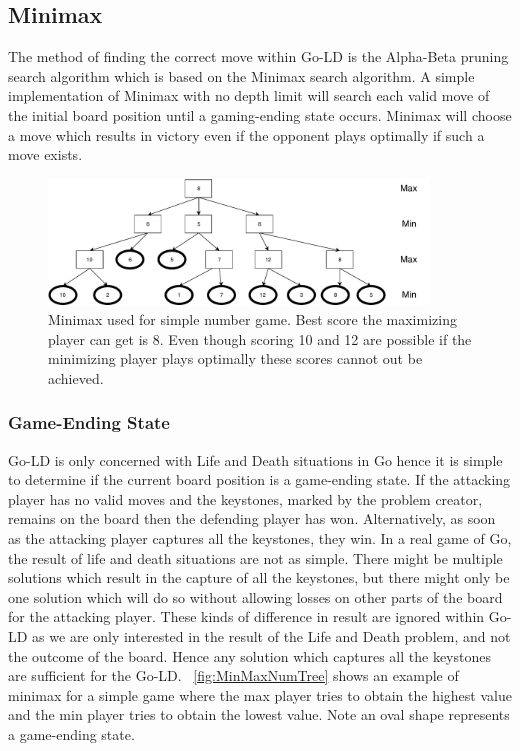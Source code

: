 \documentclass{l4proj}
\begin{document}
\subsection{Minimax}
The method of finding the correct move within Go-LD is the Alpha-Beta pruning search algorithm which is based on the Minimax search algorithm. A simple implementation of Minimax with no depth limit will search each valid move of the initial board position until a gaming-ending state occurs. Minimax will choose a move which results in victory even if the opponent plays optimally if such a move exists.

\begin{figure}[!ht]
\centering
\includegraphics[width=0.9\textwidth]{MinMaxNumTree.pdf}
\caption{Minimax used for simple number game. Best score the maximizing player can get is 8. Even though scoring 10 and 12 are possible if the minimizing player plays optimally these scores cannot out be achieved.}
\label{fig:MinMaxNumTree}
\end{figure}

\subsubsection{Game-Ending State}
Go-LD is only concerned with Life and Death situations in Go hence it is simple to determine if the current board position is a game-ending state. If the attacking player has no valid moves and the keystones, marked by the problem creator, remains on the board then the defending player has won. Alternatively, as soon as the attacking player captures all the keystones, they win. In a real game of Go, the result of life and death situations are not as simple. There might be multiple solutions which result in the capture of all the keystones, but there might only be one solution which will do so without allowing losses on other parts of the board for the attacking player. These kinds of difference in result are ignored within Go-LD as we are only interested in the result of the Life and Death problem, and not the outcome of the board. Hence any solution which captures all the keystones are sufficient for the Go-LD. ~\autoref{fig:MinMaxNumTree} shows an example of minimax for a simple game where the max player tries to obtain the highest value and the min player tries to obtain the lowest value. Note an oval shape represents a game-ending state.
\end{document}
